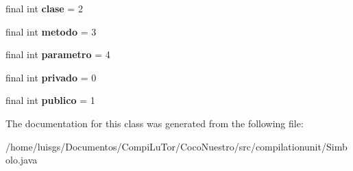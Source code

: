 \begin{DoxyCompactItemize}
\item 
\hypertarget{classcompilationunit_1_1_simbolo_a865dc9a1031d7f19bd302eb90649efec}{
final int {\bfseries clase} = 2}
\label{classcompilationunit_1_1_simbolo_a865dc9a1031d7f19bd302eb90649efec}

\item 
\hypertarget{classcompilationunit_1_1_simbolo_a7e8a4fe661f65285b74d820424355669}{
final int {\bfseries metodo} = 3}
\label{classcompilationunit_1_1_simbolo_a7e8a4fe661f65285b74d820424355669}

\item 
\hypertarget{classcompilationunit_1_1_simbolo_a9f223da341d4f72fdbd29f48d82339e4}{
final int {\bfseries parametro} = 4}
\label{classcompilationunit_1_1_simbolo_a9f223da341d4f72fdbd29f48d82339e4}

\item 
\hypertarget{classcompilationunit_1_1_simbolo_aaa045765c55f6b73abee753b1908199d}{
final int {\bfseries privado} = 0}
\label{classcompilationunit_1_1_simbolo_aaa045765c55f6b73abee753b1908199d}

\item 
\hypertarget{classcompilationunit_1_1_simbolo_a5c89aed00c7659cf9d6d3d558527304d}{
final int {\bfseries publico} = 1}
\label{classcompilationunit_1_1_simbolo_a5c89aed00c7659cf9d6d3d558527304d}

\end{DoxyCompactItemize}


The documentation for this class was generated from the following file:\begin{DoxyCompactItemize}
\item 
/home/luisgs/Documentos/CompiLuTor/CocoNuestro/src/compilationunit/Simbolo.java\end{DoxyCompactItemize}

